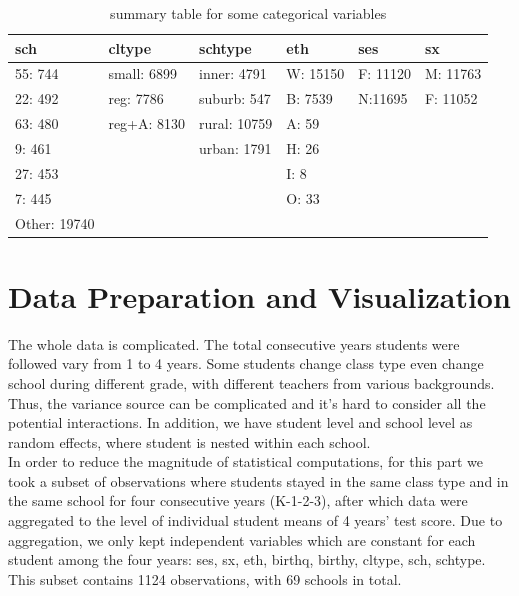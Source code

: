 \documentclass{article}
\begin{document}
\begin{table}[h]
    \centering
    \caption{summary table for some categorical variables}
    \label{table:categorical variables}
    \begin{tabular}{|l|l|l|l|l|l|}
    \hline
    sch          & cltype      & schtype      & eth      & ses      & sx       \\ \hline
    55: 744      & small: 6899 & inner: 4791  & W: 15150 & F: 11120 & M: 11763 \\ \hline
    22: 492      & reg: 7786   & suburb: 547  & B: 7539  & N:11695  & F: 11052 \\ \hline
    63: 480      & reg+A: 8130 & rural: 10759 & A: 59    &          &          \\ \hline
    9: 461       &             & urban: 1791  & H: 26    &          &          \\ \hline
    27: 453      &             &              & I: 8     &          &          \\ \hline
    7: 445       &             &              & O: 33    &          &          \\ \hline
    Other: 19740 &             &              &          &          &          \\ \hline
    \end{tabular}
\end{table}

\section{Data Preparation and Visualization}

The whole data is complicated. The total consecutive years students were followed vary from 1 to 4 years. 
Some students change class type even change school during different grade, with different teachers from various backgrounds. 
Thus, the variance source can be complicated and it’s hard to consider all the potential interactions. In addition, 
we have student level and school level as random effects, where student is nested within each school. \\

In order to reduce the magnitude of statistical computations, for this part we took a subset of observations where students 
stayed in the same class type and in the same school for four consecutive years (K-1-2-3), after which data were aggregated 
to the level of individual student means of 4 years’ test score. Due to aggregation, we only kept independent variables which 
are constant for each student among the four years: ses, sx, eth, birthq, birthy, cltype, sch, schtype. This subset contains 
1124 observations, with 69 schools in total.\\
\end{document}
